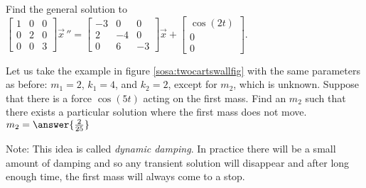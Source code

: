\documentclass{ximera}
\begin{document}
\begin{exercise}%
    Find the general solution to
    $\left[ \begin{smallmatrix}
        1 & 0 & 0\\
        0 & 2 & 0\\
        0 & 0 & 3
    \end{smallmatrix}\right]
    \vec{x}\,'' =
    \left[ \begin{smallmatrix}
        -3 & 0 & 0 \\
        2 & -4 & 0 \\
        0 & 6 & -3
    \end{smallmatrix}\right]
    \vec{x} + 
    \left[ \begin{smallmatrix}
        \cos(2t) \\ 
        0 \\ 
        0
    \end{smallmatrix}\right]$.
\end{exercise}

\begin{exercise}%
    Let us take the example in figure \ref{sosa:twocartswallfig} with the same parameters as before: $m_1 = 2$, $k_1 = 4$, and $k_2 = 2$, except for $m_2$, which is unknown. Suppose that there is a force $\cos (5 t)$ acting on the first mass. Find an $m_2$ such that there exists a particular solution where the first mass does not move. $m_2 = \answer{\frac{2}{25}}$
    
    Note: This idea is called \emph{dynamic damping}. In practice there will be a small amount of damping and so any transient solution will disappear and after long enough time, the first mass will always come to a stop.
\end{exercise}
\end{document}
